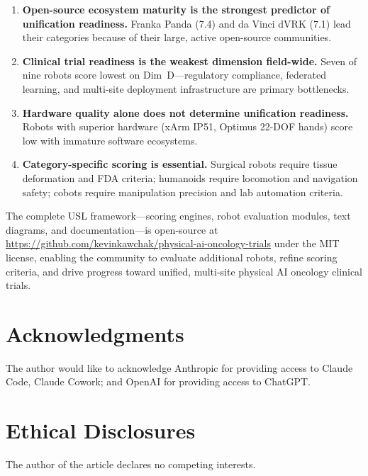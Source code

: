 \begin{enumerate}
  \item \textbf{Open-source ecosystem maturity is the strongest predictor of unification readiness.} Franka Panda (7.4) and da Vinci dVRK (7.1) lead their categories because of their large, active open-source communities.
  \item \textbf{Clinical trial readiness is the weakest dimension field-wide.} Seven of nine robots score lowest on Dim~D---regulatory compliance, federated learning, and multi-site deployment infrastructure are primary bottlenecks.
  \item \textbf{Hardware quality alone does not determine unification readiness.} Robots with superior hardware (xArm IP51, Optimus 22-DOF hands) score low with immature software ecosystems.
  \item \textbf{Category-specific scoring is essential.} Surgical robots require tissue deformation and FDA criteria; humanoids require locomotion and navigation safety; cobots require manipulation precision and lab automation criteria.
\end{enumerate}

The complete USL framework---scoring engines, robot evaluation modules, text diagrams, and documentation---is open-source at \url{https://github.com/kevinkawchak/physical-ai-oncology-trials} under the MIT license, enabling the community to evaluate additional robots, refine scoring criteria, and drive progress toward unified, multi-site physical AI oncology clinical trials.




\section*{Acknowledgments}
The author would like to acknowledge Anthropic for providing access to Claude Code, Claude Cowork; and OpenAI for providing access to ChatGPT.

\section*{Ethical Disclosures}
The author of the article declares no competing interests.

